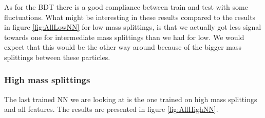 As for the BDT there is a good compliance between train and test with some fluctuations. What might be interesting in these results compared to the results in figure \ref{fig:AllLowNN} for low mass splittings, is that we actually got less signal towards one for intermediate mass splittings than we had for low. We would expect that this would be the other way around because of the bigger mass splittings between these particles.



















\subsubsection{High mass splittings}

The last trained NN we are looking at is the one trained on high mass splittings and all features. The results are presented in figure \ref{fig:AllHighNN}. 



